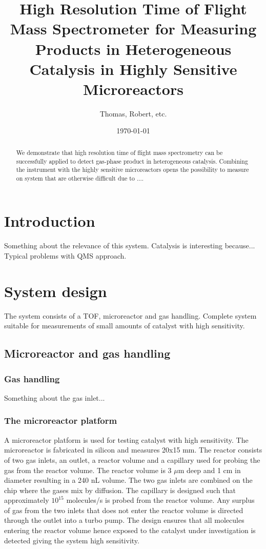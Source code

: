 \documentclass[12pt]{article}
\title{High Resolution Time of Flight Mass Spectrometer for Measuring Products in Heterogeneous Catalysis in Highly Sensitive Microreactors}
\author{Thomas, Robert, etc.}
\date{\today}
\begin{document}
\maketitle

\begin{abstract}
We demonstrate that high resolution time of flight mass spectrometry can be successfully applied to detect gas-phase product in heterogeneous catalysis. Combining the instrument with the highly sensitive microreactors opens the possibility to measure on system that are otherwise difficult due to ....
\end{abstract}

\section{Introduction}
Something about the relevance of this system. Catalysis is interesting because... Typical problems with QMS approach. 

\section{System design}
The system consists of a TOF, microreactor and gas handling. Complete system suitable for measurements of small amounts of catalyst with high sensitivity.

\subsection{Microreactor and gas handling}

\subsubsection{Gas handling}
Something about the gas inlet...

\subsubsection{The microreactor platform}
A microreactor platform is used for testing catalyst with high sensitivity. The microreactor is fabricated in silicon and measures 20x15 mm. The reactor consists of two gas inlets, an outlet, a reactor volume and a capillary used for probing the gas from the reactor volume. The reactor volume is 3 $\mu$m deep and 1 cm in diameter resulting in a 240 nL volume. The two gas inlets are combined on the chip where the gases mix by diffusion. The capillary is designed such that approximately $10^{15}$ molecules/s is probed from the reactor volume. Any surplus of gas from the two inlets that does not enter the reactor volume is directed through the outlet into a turbo pump. The design ensures that all molecules entering the reactor volume hence exposed to the catalyst under investigation is detected giving the system high sensitivity.   
\end{document}
